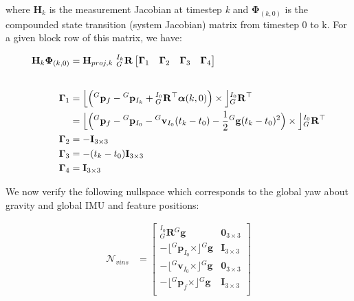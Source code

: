 where $\mathbf{H}_{k}$ is the measurement Jacobian at timestep {\itshape k} and $\mathbf{\Phi}_{(k,0)}$ is the compounded state transition (system Jacobian) matrix from timestep 0 to k. For a given block row of this matrix, we have\+:

\begin{align*} \mathbf{H}_{k}\mathbf{\Phi}_{(k,0)} &= \empty \mathbf H_{proj,k}~ {}^{I_k}_{G}\mathbf{R} \begin{bmatrix} \boldsymbol\Gamma_1 & \boldsymbol\Gamma_2 & \boldsymbol\Gamma_3 & \boldsymbol\Gamma_4 \end{bmatrix} \\[2em] \empty \empty \boldsymbol\Gamma_1 &= \Big\lfloor \Big({}^{G}\mathbf{p}_f-{}^{G}\mathbf{p}_{I_k} + {}^{I_{0}}_{G}\mathbf{R}^\top \boldsymbol\alpha(k,0) \Big) \times\Big\rfloor {}^{I_0}_{G}\mathbf{R}^\top \\ &= \Big\lfloor \Big({}^{G}\mathbf{p}_f- {}^{G}\mathbf{p}_{I_0}-{}^{G}\mathbf{v}_{I_0}(t_k-t_0)-\frac{1}{2}{}^G\mathbf{g}(t_k-t_0)^2 \Big) \times\Big\rfloor {}^{I_0}_{G}\mathbf{R}^\top \\ \boldsymbol\Gamma_2 &= -\mathbf I_{3\times3} \\ \boldsymbol\Gamma_3 &= -(t_{k}-t_0) \mathbf I_{3\times3} \\ \boldsymbol\Gamma_4 &= \mathbf I_{3\times3} \end{align*}

We now verify the following nullspace which corresponds to the global yaw about gravity and global I\+MU and feature positions\+:

\begin{align*} \mathcal{N}_{vins} &= \begin{bmatrix} {}^{I_{0}}_{G}\mathbf{R}{}^G\mathbf{g} & \mathbf 0_{3\times3} \\ -\lfloor {}^{G}\mathbf{p}_{I_0} \times\rfloor{}^G\mathbf{g} & \mathbf{I}_{3\times3} \\ -\lfloor {}^{G}\mathbf{v}_{I_0} \times\rfloor{}^G\mathbf{g} & \mathbf{0}_{3\times3} \\ -\lfloor {}^{G}\mathbf{p}_{f} \times\rfloor{}^G\mathbf{g} & \mathbf{I}_{3\times3} \\ \end{bmatrix} \end{align*}

